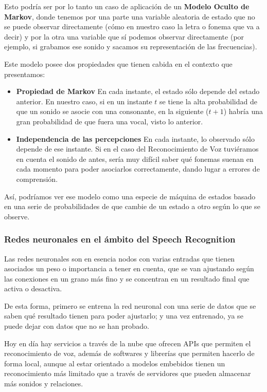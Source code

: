 Esto podría ser por lo tanto un caso de aplicación de un \textbf{Modelo Oculto de Markov}, donde tenemos por una parte una variable aleatoria de estado que no se puede observar directamente (cómo en nuestro caso la letra o fonema que va a decir) y por la otra una variable que sí podemos observar directamente (por ejemplo, si grabamos ese sonido y sacamos su representación de las frecuencias).

Este modelo posee dos propiedades que tienen cabida en el contexto que presentamos:
\begin{itemize}
	\item \textbf{Propiedad de Markov} En cada instante, el estado sólo depende del estado anterior. En nuestro caso, si en un instante $t$ se tiene la alta probabilidad de que un sonido se asocie con una consonante, en la siguiente ($t+1$) habría una gran probabilidad de que fuera una vocal, visto lo anterior.
	
	\item \textbf{Independencia de las percepciones} En cada instante, lo observado sólo depende de ese instante. Si en el caso del Reconocimiento de Voz tuviéramos en cuenta el sonido de antes, sería muy difícil saber qué fonemas suenan en cada momento para poder asociarlos correctamente, dando lugar a errores de comprensión.
\end{itemize}

Así, podríamos ver ese modelo como una especie de máquina de estados basado en una serie de probabilidades de que cambie de un estado a otro según lo que se observe.

\subsubsection{Redes neuronales en el ámbito del Speech Recognition}
Las redes neuronales son en esencia nodos con varias entradas que tienen asociados un peso o importancia a tener en cuenta, que se van ajustando según las conexiones en un grano más fino y se concentran en un resultado final que activa o desactiva.

De esta forma, primero se entrena la red neuronal con una serie de datos que se saben qué resultado tienen para poder ajustarlo; y una vez entrenado, ya se puede dejar con datos que no se han probado.

Hoy en día hay servicios a través de la nube que ofrecen APIs que permiten el reconocimiento de voz, además de softwares y librerías que permiten hacerlo de forma local, aunque al estar orientado a modelos embebidos tienen un reconocimiento más limitado que a través de servidores que pueden almacenar más sonidos y relaciones.


